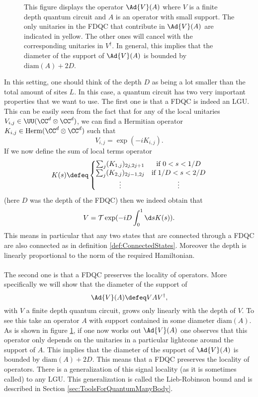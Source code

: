 \begin{figure}
	\centering
	
	\caption{This figure displays the operator $\Ad{V}(A)$ where $V$ is a finite depth quantum circuit and $A$ is an operator with small support. The only unitaries in the FDQC that contribute in $\Ad{V}(A)$ are indicated in yellow. The other ones will cancel with the corresponding unitaries in $V^\dagger$. In general, this implies that the diameter of the support of $\Ad{V}(A)$ is bounded by $\text{diam}(A)+2D$.}
	\label{fig:FiniteDepthQuantumCirquitLightcone}
\end{figure}
In this setting, one should think of the depth $D$ as being a lot smaller than the total amount of sites $L$. In this case, a quantum circuit has two very important properties that we want to use. The first one is that a FDQC is indeed an LGU. This can be easily seen from the fact that for any of the local unitaries $V_{i,j}\in\UU(\CC^d\otimes\CC^d)$, we can find a Hermitian operator $K_{i,j}\in\textrm{Herm}(\CC^d\otimes\CC^d)$ such that
\begin{equation}
V_{i,j}=\exp(-i K_{i,j}).
\end{equation}
If we now define the sum of local terms operator
\begin{equation}
K(s)\defeq \left\{\begin{matrix}
\sum_{j}(K_{1,j})_{2j,2j+1}&\text{if }0<s<1/D\\
\sum_{j}(K_{2,j})_{2j-1,2j}&\text{if }1/D<s<2/D\\
\vdots&\vdots
\end{matrix}\right.
\end{equation}
(here $D$ was the depth of the FDQC) then we indeed obtain that
\begin{equation}
V=\mathcal{T}\exp(-iD\int_0^1 \d s K(s)).
\end{equation}
This means in particular that any two states that are connected through a FDQC are also connected as in definition \ref{def:ConnectedStates}. Moreover the depth is linearly proportional to the norm of the required Hamiltonian.
\\\\
The second one is that a FDQC preserves the locality of operators. More specifically we will show that the diameter of the support of
\begin{equation}
	\Ad{V}(A)\defeq V A V^\dagger,
\end{equation}
with $V$ a finite depth quantum circuit, grows only linearly with the depth of $V$. To see this take an operator $A$ with support contained in some diameter $\text{diam}(A)$. As is shown in figure \ref{fig:FiniteDepthQuantumCirquitLightcone}, if one now works out $\Ad{V}(A)$ one observes that this operator only depends on the unitaries in a particular lightcone around the support of $A$. This implies that the diameter of the support of $\Ad{V}(A)$ is bounded by $\text{diam}(A)+2D$. This means that a FDQC preserves the locality of operators. There is a generalization of this signal locality (as it is sometimes called) to any LGU. This generalization is called the Lieb-Robinson bound and is described in Section \ref{sec:ToolsForQuantumManyBody}.
